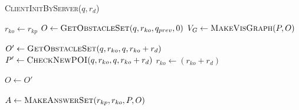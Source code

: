 \documentclass{sig-alternate}
\begin{document}
\begin{algorithm}
\caption{\textsc{ClientInitByServer}($q, r_d$)}
\label{ClientInitByServer}

    
	 $r_{ko} \gets r_{kp} $ \; %
	 $O \gets \textsc{GetObstacleSet}(q, r_{ko}, q_{prev}, 0)$ \;
	 $V_G \gets \textsc{MakeVisGraph}(P, O)$ \;
	  { 
		$O' \gets \textsc{GetObstacleSet}(q, r_{ko}, q, r_{ko}+r_d)$ \;
		$P' \gets \textsc{CheckNewPOI}(q, r_{ko}, q, r_{ko}+r_d)$ \;
		$r_{ko} \gets (r_{ko} + r_d)$ \;
		
		$O \gets O'$
	} \label{while}
	
	 \Return $A \gets \textsc{MakeAnswerSet}(r_{kp}, r_{ko}, P, O)$ 
\end{algorithm}
\end{document}
